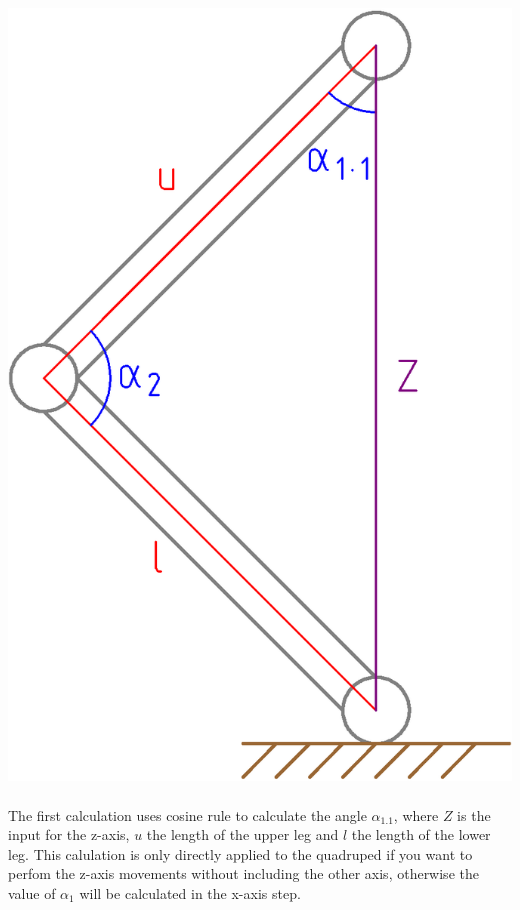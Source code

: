 \documentclass{article}
\begin{document}
    \paragraph{}
    \includegraphics[scale=0.2]{z-axis}

    \paragraph{}
    The first calculation uses cosine rule to calculate the angle $\alpha_{1.1}$, where $Z$ is the input for the z-axis, $u$ the length of the upper leg and $l$ the length of the lower leg. This calulation is only directly applied to the quadruped if you want to perfom the z-axis movements without including the other axis, otherwise the value of $\alpha_1$ will be calculated in the x-axis step.
\end{document}
